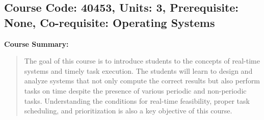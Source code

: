 \documentclass[12pt]{article}
\begin{document}
\subsection*{Course Code: 40453, Units: 3, Prerequisite: None, Co-requisite: Operating Systems}

\textbf{Course Summary:} 
\begin{quote}
   The goal of this course is to introduce students to the concepts of real-time systems and timely task execution. The students will learn to design and analyze systems that not only compute the correct results but also perform tasks on time despite the presence of various periodic and non-periodic tasks. Understanding the conditions for real-time feasibility, proper task scheduling, and prioritization is also a key objective of this course.
\end{quote}
\end{document}
